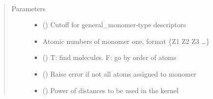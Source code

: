 \documentclass[letterpaper,10pt,english]{sphinxmanual}
\begin{document}
\begin{fulllineitems}
\label{\detokenize{descriptors:gap.descriptors.general_monomer}}~\begin{quote}\begin{description}
\item[{Parameters}] \leavevmode\begin{itemize}
\item {} 
 () \textendash{} Cutoff for general\_monomer-type descriptors

\item {} 
 \textendash{} Atomic numbers of monomer one, format \{Z1 Z2 Z3 …\}

\item {} 
 () \textendash{} T: find molecules. F: go by order of atoms

\item {} 
 () \textendash{} Raise error if not all atoms assigned to monomer

\item {} 
 () \textendash{} Power of distances to be used in the kernel

\end{itemize}

\end{description}\end{quote}

\end{fulllineitems}

\end{document}
